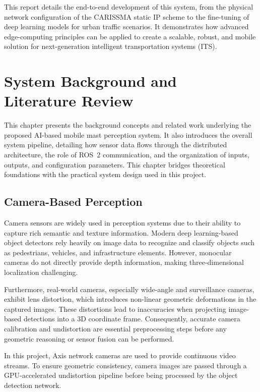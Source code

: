 \documentclass[12pt,a4paper]{report}
\begin{document}
This report details the end-to-end development of this system, from the physical network configuration of the CARISSMA static IP scheme to the fine-tuning of deep learning models for urban traffic scenarios. It demonstrates how advanced edge-computing principles can be applied to create a scalable, robust, and mobile solution for next-generation intelligent transportation systems (ITS).

\chapter[System Background]{System Background and \\ Literature Review}

This chapter presents the background concepts and related work underlying the proposed AI-based mobile mast perception system. It also introduces the overall system pipeline, detailing how sensor data flows through the distributed architecture, the role of ROS~2 communication, and the organization of inputs, outputs, and configuration parameters. This chapter bridges theoretical foundations with the practical system design used in this project.

\section{Camera-Based Perception}
Camera sensors are widely used in perception systems due to their ability to capture rich semantic and texture information. Modern deep learning-based object detectors rely heavily on image data to recognize and classify objects such as pedestrians, vehicles, and infrastructure elements. However, monocular cameras do not directly provide depth information, making three-dimensional localization challenging.

Furthermore, real-world cameras, especially wide-angle and surveillance cameras, exhibit lens distortion, which introduces non-linear geometric deformations in the captured images. These distortions lead to inaccuracies when projecting image-based detections into a 3D coordinate frame. Consequently, accurate camera calibration and undistortion are essential preprocessing steps before any geometric reasoning or sensor fusion can be performed.

In this project, Axis network cameras are used to provide continuous video streams. To ensure geometric consistency, camera images are passed through a GPU-accelerated undistortion pipeline before being processed by the object detection network.
\end{document}
